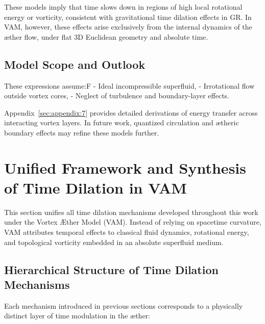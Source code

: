 \documentclass[preprint]{revtex4-2}
\begin{document}
These models imply that time slows down in regions of high local rotational energy or vorticity, consistent with gravitational time dilation effects in GR. In VAM, however, these effects arise exclusively from the internal dynamics of the æther flow, under flat 3D Euclidean geometry and absolute time.

\subsection*{Model Scope and Outlook}

These expressions assume:F
- Ideal incompressible superfluid,
- Irrotational flow outside vortex cores,
- Neglect of turbulence and boundary-layer effects.

Appendix~\ref{sec:appendix:7} provides detailed derivations of energy transfer across interacting vortex layers. In future work, quantized circulation and ætheric boundary effects may refine these models further.
\section{Unified Framework and Synthesis of Time Dilation in VAM}

This section unifies all time dilation mechanisms developed throughout this work under the Vortex Æther Model (VAM). Instead of relying on spacetime curvature, VAM attributes temporal effects to classical fluid dynamics, rotational energy, and topological vorticity embedded in an absolute superfluid medium.

\subsection{Hierarchical Structure of Time Dilation Mechanisms}

Each mechanism introduced in previous sections corresponds to a physically distinct layer of time modulation in the æther:
\end{document}
